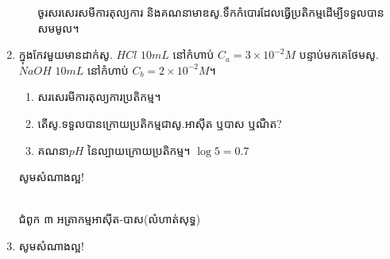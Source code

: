 \documentclass[12pt, a5paper]{article}
\begin{document}
\begin{enumerate}[m]
\begin{enumerate}[k]
		ចូរសរសេរសមីការតុល្យការ និងគណនាមាឌសូ.ទឹកកំបោរដែលធ្វើប្រតិកម្មដើម្បីទទួលបានសមមូល។
	\end{enumerate}
	\item ក្នុងកែវមួយមានដាក់សូ. $HCl$ $10mL$ នៅកំហាប់ $C_a=3\times10^{-2}M$ បន្ទាប់មកគេថែមសូ. $NaOH$ $10mL$ នៅកំហាប់ $C_b=2\times10^{-2}M$។
	\begin{enumerate}[k]
		\item សរសេរមីការតុល្យការប្រតិកម្ម។
		\item តើសូ.ទទួលបានក្រោយប្រតិកម្មជាសូ.អាស៊ីត ឬបាស ឬណឺត?
		\item គណនា$pH$ នៃល្បាយក្រោយប្រតិកម្ម។ $\log5=0.7$
	\end{enumerate}
	\begin{center}
		\sffamily\color{black}
		សូមសំណាងល្អ!
	\end{center}\newpage
	\begin{center}
		\sffamily\color{black}
		\\
		ជំពូក ៣ អត្រាកម្មអាស៊ីត-បាស(លំហាត់សុទ្ធ)
	\end{center}
	\item 
	\begin{center}
		\sffamily\color{black}
		សូមសំណាងល្អ!
	\end{center}\newpage
\end{enumerate}
\end{document}
